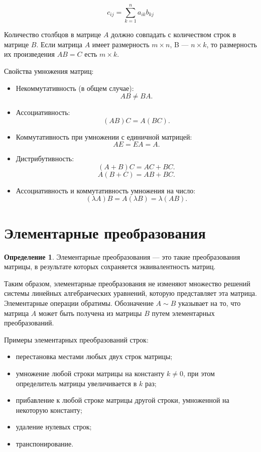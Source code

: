 \documentclass[a5paper, 11pt]{extbook}
\theoremstyle{definition}
\theoremstyle{definition}
\newtheorem{definition}{Определение}[chapter]
\begin{document}
\begin{equation*}
    c_{ij} = \sum_{k=1}^n a_{ik} b_{kj}
\end{equation*}

Количество столбцов в матрице \(A\) должно совпадать с количеством строк в матрице \(B\). Если матрица \(A\) имеет размерность \(m \times n\), B — \(n \times k\), то размерность их произведения \(AB = C\) есть \(m \times k\).

Свойства умножения матриц:
\begin{itemize}
    \item Некоммутативность (в общем случае):
          \[
              AB \neq BA.
          \]
    \item Ассоциативность:
          \[
              (AB)C = A(BC).
          \]
    \item Коммутативность при умножении с единичной матрицей:
          \[
              AE = EA = A.
          \]
    \item Дистрибутивность:
          \[
              (A + B) C = AC + BC.
          \]
          \[
              A (B + C) = AB + BC.
          \]
    \item Ассоциативность и коммутативность умножения на число:
          \[
              (\lambda A) B = A (\lambda B) = \lambda (AB).
          \]
\end{itemize}

\section{Элементарные преобразования}
\label{sec:org11b71ac}
\begin{definition}
    Элементарные преобразования — это такие преобразования матрицы, в результате которых сохраняется эквивалентность матриц.
\end{definition}

Таким образом, элементарные преобразования не изменяют множество решений системы линейных алгебраических уравнений, которую представляет эта матрица. Элементарные операции обратимы. Обозначение \(A \sim B\) указывает на то, что матрица \(A\) может быть получена из матрицы \(B\) путем элементарных преобразований.

Примеры элементарных преобразований строк:
\begin{itemize}
    \item перестановка местами любых двух строк матрицы;
    \item умножение любой строки матрицы на константу \(k \neq 0\), при этом определитель матрицы увеличивается в \(k\) раз;
    \item прибавление к любой строке матрицы другой строки, умноженной на некоторую константу;
    \item удаление нулевых строк;
    \item транспонирование.
\end{itemize}
\end{document}
